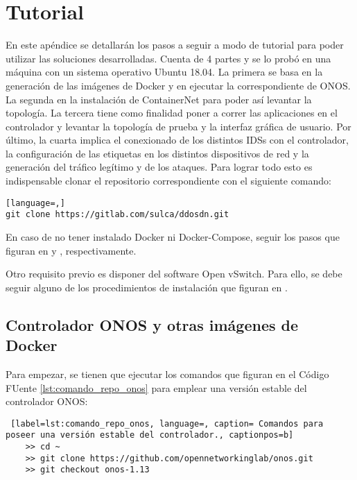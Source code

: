 
\chapter{Tutorial} %

\label{AppendixD} %

En este apéndice se detallarán los pasos a seguir a modo de tutorial para poder utilizar las soluciones desarrolladas. Cuenta de 4 partes y se lo probó en una máquina con un sistema operativo Ubuntu 18.04. La primera se basa en la generación de las imágenes de Docker y en ejecutar la correspondiente de ONOS. La segunda en la instalación de ContainerNet para poder así levantar la topología. La tercera tiene como finalidad poner a correr las aplicaciones en el controlador y levantar la topología de prueba y la interfaz gráfica de usuario. Por último, la cuarta implica el conexionado de los distintos IDSs con el controlador, la configuración de las etiquetas en los distintos dispositivos de red y la generación del tráfico legítimo y de los ataques. Para lograr todo esto es indispensable clonar el repositorio correspondiente con el siguiente comando:

\begin{lstlisting}[language=,]
git clone https://gitlab.com/sulca/ddosdn.git
\end{lstlisting}


En caso de no tener instalado Docker ni Docker-Compose, seguir los pasos que figuran en \parencite{pasos_instalar_docker} y \parencite{pasos_instalar_docker_compose}, respectivamente.

Otro requisito previo es disponer del software Open vSwitch. Para ello, se debe seguir alguno de los procedimientos de instalación que figuran en \parencite{pasos_instalar_OVS}.



\section {Controlador ONOS y otras imágenes de Docker}

Para empezar, se tienen que ejecutar los comandos que figuran en el Código FUente \ref{lst:comando_repo_onos} para emplear una versión estable del controlador ONOS:\\

\begin{lstlisting} [label=lst:comando_repo_onos, language=, caption= Comandos para poseer una versión estable del controlador., captionpos=b]
    >> cd ~
    >> git clone https://github.com/opennetworkinglab/onos.git
    >> git checkout onos-1.13
\end{lstlisting}

